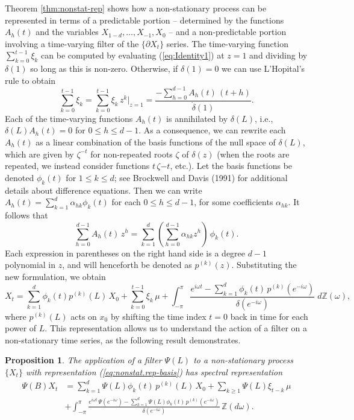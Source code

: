 \documentclass[a4paper]{book}
\def\ZZ{\mathbb Z}
\newtheorem{Proposition}{Proposition}
\begin{document}
  
  Theorem  \ref{thm:nonstat-rep} shows how a non-stationary process
  can be represented in  terms of a predictable
  portion -- determined by the functions $A_{h} (t)$ and the
  variables $X_{1-d}, \ldots, X_{-1}, X_0$ -- and a
  non-predictable portion involving a time-varying filter of the $\{
  \partial X_t \}$ series. 
  The time-varying function $\sum_{k=0}^{t-1} \xi_k $ can be computed
  by evaluating (\ref{eq:Identity1}) at $z=1$ and dividing by $\delta (1)$
   so long as this is non-zero.  Otherwise, if $\delta (1) = 0$ we can
   use L'Hopital's rule to obtain
  \[
   \sum_{k=0}^{t-1} \xi_k = \sum_{k=0}^{t-1} \xi_k \, z^k \vert_{z = 1}
   = \frac{ - \sum_{h=0}^{d-1} A_h (t) \, (t+h) }{ \dot{\delta} (1)}.
  \]
     Each of the time-varying functions $A_h (t)$ is annihilated
 by $\delta (L)$, i.e., $\delta (L) A_{h} (t) = 0$ for $0 \leq
 h \leq d-1$.   As a consequence, we can rewrite each $A_{h} (t)$ as a linear
 combination of the basis functions of the null space of $\delta
 (L)$, which are given by $\zeta^{-t}$ for non-repeated roots $\zeta$
  of $\delta (z)$ (when the roots are repeated, we instead consider
  functions $t \, \zeta{-t}$, etc.).  
    Let the basis  functions be denoted
    $\phi_k (t) $ for $1 \leq k \leq d$; see Brockwell and Davis (1991)
     for additional details about difference equations.  Then we can
 write $A_{h} (t) = \sum_{k=1}^d \alpha_{hk} \phi_k (t)$ for each $0 \leq
 h \leq d-1$, for some coefficients $\alpha_{hk}$.  It follows that
\[
 \sum_{h=0}^{d-1} A_{h}(t) \, z^h = \sum_{k=1}^d \left(
 \sum_{h=0}^{d-1} \alpha_{hk} z^h \right)  \, \phi_k (t).
\]
 Each expression in parentheses on the right hand side is a degree
 $d-1$ polynomial in $z$, and will henceforth be denoted as $p^{(k)}
 (z)$.   Substituting the new formulation, we obtain
\begin{equation}
\label{eq:nonstat.rep-basis}
 X_t = \sum_{k=1}^d \phi_k (t) p^{(k)} (L) \, X_{0} + 
  \sum_{k=0}^{t-1} \xi_k \, \mu  +  \int_{-\pi}^{\pi}
 \frac{ e^{i \omega t} - \sum_{k=1}^d \phi_k (t) \, p^{(k)} ( e^{-i \omega
 } )}{ \delta (e^{-i \omega}) } \; d \ZZ (\omega),
\end{equation}
 where $p^{(k)} (L)$ acts on $x_0$ by shifting the time index $t=0$
 back in time for each power of $L$.  
  This representation allows us to 
  understand the action of a filter on a non-stationary time series,
  as the following result demonstrates.
  
\begin{Proposition}
  \label{prop:filter-nonstat}
  The application of a filter $\Psi (L)$ to a non-stationary process $\{ X_t \}$
  with representation  (\ref{eq:nonstat.rep-basis}) has spectral representation
 \begin{align*}
 \Psi (B) X_t & =   \sum_{k=1}^d \Psi (L) \phi_k (t) \, p^{(k)} (L) \, X_{0}  +
   \sum_{k \geq 1}  \Psi (L)  \xi_{t-k} \, \mu \\
   & +   \int_{-\pi}^{\pi}
   \frac{ e^{i \omega t} \, \Psi (e^{-i \omega}) 
   - \sum_{k=1}^d \Psi (L) \phi_k (t) \, p^{(k)} (e^{-i \omega}) 
    }{ \delta (e^{-i \omega}) } \, \ZZ (d\omega).
 \end{align*}
 \end{Proposition}
  
\end{document}
